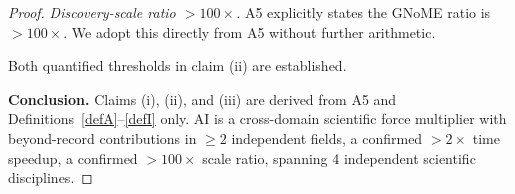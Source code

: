 \begin{proof}
\emph{Discovery-scale ratio $>100\times$.}
A5 explicitly states the GNoME ratio is $>100\times$.
We adopt this directly from A5 without further arithmetic.

Both quantified thresholds in claim (ii) are established.

\medskip
\noindent\textbf{Conclusion.}
Claims (i), (ii), and (iii) are derived from A5 and
Definitions~\ref{defA}--\ref{defI} only.
AI is a cross-domain scientific force multiplier with beyond-record
contributions in $\geq 2$ independent fields, a confirmed $>2\times$
time speedup, a confirmed $>100\times$ scale ratio, spanning 4
independent scientific disciplines.
\end{proof}

